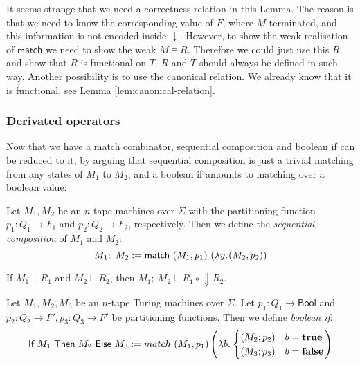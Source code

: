 \documentclass{psartcl}
\renewcommand{\vDash}{\models} \DeclareRobustCommand{\VDash}{\mathrel{|\mkern-2mu|}\joinrel \Relbar}
\newcommand{\lam}[2]{\lambda#1{.}\hskip.7pt#2}
\newcommand{\MS}[1]{\textsf{#1}}
\newcommand{\from}{:}
\renewcommand{\to}{\rightarrow}
\newcommand{\Bool}{\MS{Bool}}
\newcommand{\true}{\mathbf{true}}
\newcommand{\false}{\mathbf{false}}
\DeclareMathOperator{\hideParam}{\Downarrow}
\newcommand{\mseq}{;~}
\newcommand{\mif}[3]{\MS{If}~#1~\MS{Then}~#2~\MS{Else}~#3}
\newcommand{\mmatch}{\MS{match}}
\begin{document}
It seems strange that we need a correctness relation in this Lemma.  The reason is that we need to know the corresponding value of $F$, where $M$
terminated, and this information is not encoded inside $\downarrow$.  However, to show the weak realisation of $\MS{match}$ we need to show the weak
$M \vDash R$.  Therefore we could just use this $R$ and show that $R$ is functional on $T$.  $R$ and $T$ should always be defined in such way.
Another possibility is to use the canonical relation.  We already know that it is functional, see Lemma \ref{lem:canonical-relation}.

\subsubsection{Derivated operators}

Now that we have a match combinator, sequential composition and boolean if can be reduced to it, by arguing that sequential composition is just a
trivial matching from any states of $M_1$ to $M_2$, and a boolean if amounts to matching over a boolean value:


\begin{definition}
  \label{def:seq}
  Let $M_1, M_2$ be an $n$-tape machines over $\Sigma$ with the partitioning function $p_1 \from Q_1 \to F_1$ and $p_2 \from Q_2 \to F_2$,
  respectively.  Then we define the \emph{sequential composition} of $M_1$ and $M_2$:
  $$M_1 \mseq M_2 := \mmatch~(M_1, p_1)~(\lam y (M_2, p_2))$$
\end{definition}

\begin{corollary}
  \label{lem:seq}
  If $M_1 \vDash R_1$ and $M_2 \vDash R_2$, then $M_1 \mseq M_2 \vDash R_1 \circ \hideParam R_2$.
\end{corollary}

\begin{definition}[Boolean if]
  \label{def:if}
  Let $M_1, M_2, M_3$ be an $n$-tape Turing machines over $\Sigma$.
  Let $p_1 \from Q_1 \to \Bool$ and $p_2 \from Q_2 \to F', p_3 \from Q_3 \to F'$ be partitioning functions.
  Then we define \emph{boolean if}:
  $$\mif{M_1}{M_2}{M_3} := match~(M_1, p_1) \left(\lam b \begin{cases} (M_2; p_2) & b = \true \\ (M_3; p_3) & b = \false \end{cases} \right)$$
\end{definition}
\end{document}
